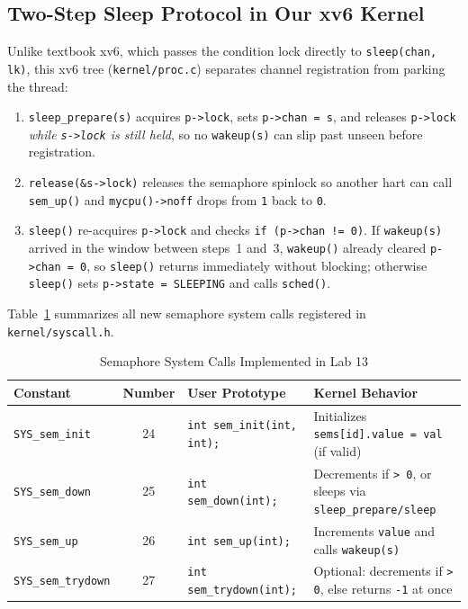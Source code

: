 \documentclass[12pt,a4paper]{article}
\begin{document}
\subsection{Two-Step Sleep Protocol in Our xv6 Kernel}
Unlike textbook xv6, which passes the condition lock directly to \texttt{sleep(chan, lk)}, this xv6 tree (\texttt{kernel/\allowbreak proc.c}) separates channel registration from parking the thread:
\begin{enumerate}
    \item \texttt{sleep\_\allowbreak prepare(s)} acquires \texttt{p->lock}, sets \texttt{p->chan = s}, and releases \texttt{p->lock} \emph{while \texttt{s->lock} is still held}, so no \texttt{wakeup(s)} can slip past unseen before registration.
    \item \texttt{release(\&s->lock)} releases the semaphore spinlock so another hart can call \texttt{sem\_\allowbreak up()} and \texttt{mycpu()->noff} drops from \texttt{1} back to \texttt{0}.
    \item \texttt{sleep()} re-acquires \texttt{p->lock} and checks \texttt{if (p->chan != 0)}. If \texttt{wakeup(s)} arrived in the window between steps~1 and~3, \texttt{wakeup()} already cleared \texttt{p->chan = 0}, so \texttt{sleep()} returns immediately without blocking; otherwise \texttt{sleep()} sets \texttt{p->state = SLEEPING} and calls \texttt{sched()}.
\end{enumerate}

Table~\ref{tab:syscalls} summarizes all new semaphore system calls registered in \texttt{kernel/\allowbreak syscall.h}.

\begin{table}[H]
\centering
\caption{Semaphore System Calls Implemented in Lab 13}
\label{tab:syscalls}
\begin{tabularx}{\textwidth}{l c l >{\raggedright\arraybackslash}X}
\toprule
\textbf{Constant} & \textbf{Number} & \textbf{User Prototype} & \textbf{Kernel Behavior} \\
\midrule
\texttt{SYS\_\allowbreak sem\_\allowbreak init} & 24 & \texttt{int sem\_\allowbreak init(int, int);} & Initializes \texttt{sems[id].value = val} (if valid) \\
\texttt{SYS\_\allowbreak sem\_\allowbreak down} & 25 & \texttt{int sem\_\allowbreak down(int);} & Decrements if \texttt{> 0}, or sleeps via \texttt{sleep\_\allowbreak prepare/sleep} \\
\texttt{SYS\_\allowbreak sem\_\allowbreak up} & 26 & \texttt{int sem\_\allowbreak up(int);} & Increments \texttt{value} and calls \texttt{wakeup(s)} \\
\texttt{SYS\_\allowbreak sem\_\allowbreak trydown} & 27 & \texttt{int sem\_\allowbreak trydown(int);} & Optional: decrements if \texttt{> 0}, else returns \texttt{-1} at once \\
\bottomrule
\end{tabularx}
\end{table}
\end{document}
